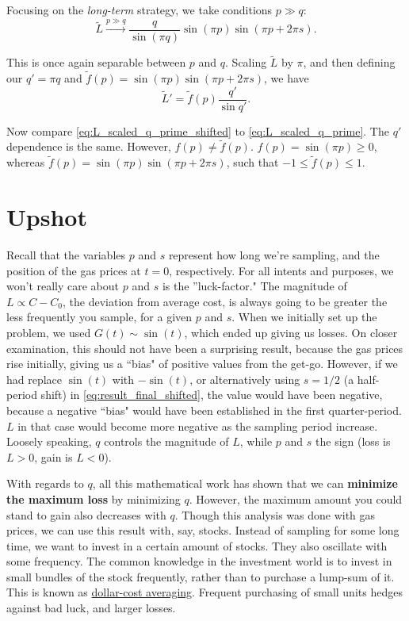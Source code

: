\documentclass[11pt]{article}
\begin{document}
Focusing on the \textit{long-term} strategy, we take conditions $p \gg q$:
\begin{equation}
\tilde{L} \xrightarrow{p \gg q}  \frac{q}{\sin(\pi q)} \sin(\pi p) \sin(\pi p + 2\pi s).
\end{equation}

This is once again separable between $p$ and $q$. Scaling $\tilde{L}$ by $\pi$, and then defining our $q' = \pi q$ and $\tilde{f}(p) = \sin(\pi p) \sin(\pi p + 2\pi s)$, we have
\begin{equation}
\tilde{L}' = \tilde{f}(p)\frac{q'}{\sin q'} .  \label{eq:L_scaled_q_prime_shifted}
\end{equation}

Now compare \eqref{eq:L_scaled_q_prime_shifted} to \eqref{eq:L_scaled_q_prime}. The $q'$ dependence is the same. However, $f(p) \neq \tilde{f}(p)$. $f(p) = \sin (\pi p) \geq 0$, whereas $\tilde{f}(p) = \sin (\pi p) \sin (\pi p + 2\pi s)$, such that $-1 \leq \tilde{f}(p) \leq 1$. 

\section*{Upshot} 
Recall that the variables $p$ and $s$ represent how long we're sampling, and the position of the gas prices at $t=0$, respectively. For all intents and purposes, we won't really care about $p$ and $s$ is the ''luck-factor." The magnitude of $L \propto C - C_0$, the deviation from average cost, is always going to be greater the less frequently you sample, for a given $p$ and $s$. When we initially set up the problem, we used $G(t) \sim \sin (t)$, which ended up giving us losses. On closer examination, this should not have been a surprising result, because the gas prices rise initially, giving us a ``bias" of positive values from the get-go. However, if we had replace $\sin(t)$ with $-\sin(t)$, or alternatively using $s = 1/2$ (a half-period shift) in \eqref{eq:result_final_shifted}, the value would have been negative, because a negative ``bias" would have been established in the first quarter-period. $L$ in that case would become more negative as the sampling period increase. Loosely speaking, $q$ controls the magnitude of $L$, while $p$ and $s$ the sign (loss is $L > 0$, gain is $L < 0$).\\

\par
With regards to $q$, all this mathematical work has shown that we can \textbf{minimize the maximum loss} by minimizing $q$. However, the maximum amount you could stand to gain also decreases with $q$. Though this analysis was done with gas prices, we can use this result with, say, stocks. Instead of sampling for some long time, we want to invest in a certain amount of stocks. They also oscillate with some frequency. The common knowledge in the investment world is to invest in small bundles of the stock frequently, rather than to purchase a lump-sum of it. This is known as \href{https://en.wikipedia.org/wiki/Dollar_cost_averaging}{dollar-cost averaging}. Frequent purchasing of small units hedges against bad luck, and larger losses.\\
\end{document}
